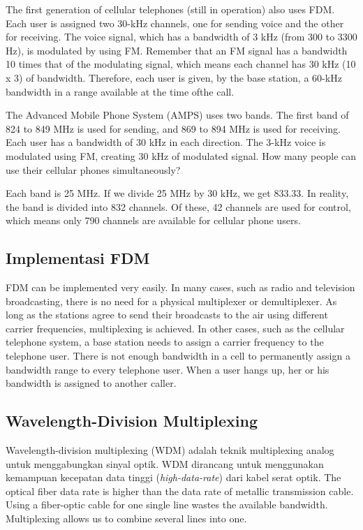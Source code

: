 The first generation of cellular telephones (still in operation) also uses FDM. Each user is assigned two 30-kHz channels, one for sending voice and the other for receiving. The voice signal, which has a bandwidth of 3 kHz (from 300 to 3300 Hz), is modulated by using FM. Remember that an FM signal has a bandwidth 10 times that of the modulating signal, which means each channel has 30 kHz (10 x 3) of bandwidth. Therefore, each user is given, by the base station, a 60-kHz bandwidth in a range available at the time ofthe call.

\vspace{12pt}

\begin{example}
  The Advanced Mobile Phone System (AMPS) uses two bands. The first band of 824 to 849 MHz is used for sending, and 869 to 894 MHz is used for receiving. Each user has a bandwidth of 30 kHz in each direction. The 3-kHz voice is modulated using FM, creating 30 kHz of modulated signal. How many people can use their cellular phones simultaneously?
  \label{example6:4}
\end{example}

\begin{solution}
  Each band is 25 MHz. If we divide 25 MHz by 30 kHz, we get 833.33. In reality, the band is divided into 832 channels. Of these, 42 channels are used for control, which means only 790 channels are available for cellular phone users.
\end{solution}

\subsection*{Implementasi FDM}
FDM can be implemented very easily. In many cases, such as radio and television broadcasting, there is no need for a physical multiplexer or demultiplexer. As long as the stations agree to send their broadcasts to the air using different carrier frequencies, multiplexing is achieved. In other cases, such as the cellular telephone system, a base station needs to assign a carrier frequency to the telephone user. There is not enough bandwidth in a cell to permanently assign a bandwidth range to every telephone user. When a user hangs up, her or his bandwidth is assigned to another caller.

\subsection{Wavelength-Division Multiplexing}
Wavelength-division multiplexing (WDM) adalah teknik multiplexing analog untuk menggabungkan sinyal optik. WDM dirancang untuk menggunakan kemampuan kecepatan data tinggi (\textit{high-data-rate}) dari kabel serat optik. The optical fiber data rate is higher than the data rate of metallic transmission cable. Using a fiber-optic cable for one single line wastes the available bandwidth. Multiplexing allows us to combine several lines into one.

